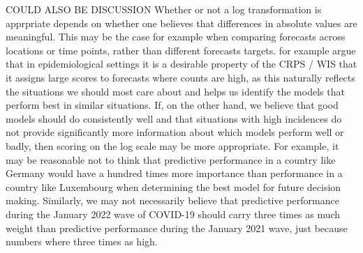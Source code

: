 \documentclass{article}
\begin{document}


COULD ALSO BE DISCUSSION
Whether or not a log transformation is apprpriate depends on whether one believes that differences in absolute values are meaningful. This may be the case for example when comparing forecasts across locations or time points, rather than different forecasts targets. \citep{Bracher} for example argue that in epidemiological settings it is a desirable property of the CRPS / WIS that it assigns large scores to forecasts where counts are high, as this naturally reflects the situations we should most care about and helps us identify the models that perform best in similar situations. If, on the other hand, we believe that good models should do consistently well and that situations with high incidences do not provide significantly more information about which models perform well or badly, then scoring on the log scale may be more appropriate. For example, it may be reasonable not to think that predictive performance in a country like Germany would have a hundred times more importance than performance in a country like Luxembourg when determining the best model for future decision making. Similarly, we may not necessarily believe that predictive performance during the January 2022 wave of COVID-19 should carry three times as much weight than predictive performance during the January 2021 wave, just because numbers where three times as high. 
\end{document}
